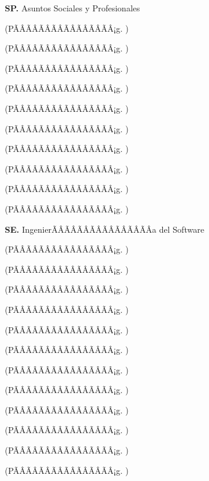 	\textbf{SP.}  Asuntos Sociales y Profesionales%
	\begin{list}{}{%
		\setlength{\labelwidth}{0pt}%
		\setlength{\leftmargin}{15pt}}%
		\item \SPUNODef(PÃÂÃÂÃÂÃÂÃÂÃÂÃÂÃÂ¡g. \pageref{sec:BOK-SP1})
		\item \SPDOSDef(PÃÂÃÂÃÂÃÂÃÂÃÂÃÂÃÂ¡g. \pageref{sec:BOK-SP2})
		\item \SPTRESDef(PÃÂÃÂÃÂÃÂÃÂÃÂÃÂÃÂ¡g. \pageref{sec:BOK-SP3})
		\item \SPCUATRODef(PÃÂÃÂÃÂÃÂÃÂÃÂÃÂÃÂ¡g. \pageref{sec:BOK-SP4})
		\item \SPCINCODef(PÃÂÃÂÃÂÃÂÃÂÃÂÃÂÃÂ¡g. \pageref{sec:BOK-SP5})
		\item \SPSEISDef(PÃÂÃÂÃÂÃÂÃÂÃÂÃÂÃÂ¡g. \pageref{sec:BOK-SP6})
		\item \SPSIETEDef(PÃÂÃÂÃÂÃÂÃÂÃÂÃÂÃÂ¡g. \pageref{sec:BOK-SP7})
		\item \SPOCHODef(PÃÂÃÂÃÂÃÂÃÂÃÂÃÂÃÂ¡g. \pageref{sec:BOK-SP8})
		\item \SPNUEVEDef(PÃÂÃÂÃÂÃÂÃÂÃÂÃÂÃÂ¡g. \pageref{sec:BOK-SP9})
		\item \SPDIEZDef(PÃÂÃÂÃÂÃÂÃÂÃÂÃÂÃÂ¡g. \pageref{sec:BOK-SP10})
	\end{list}%
	\textbf{SE.}  IngenierÃÂÃÂÃÂÃÂÃÂÃÂÃÂÃÂ­a del Software%
	\begin{list}{}{%
		\setlength{\labelwidth}{0pt}%
		\setlength{\leftmargin}{15pt}}%
		\item \SEUNODef(PÃÂÃÂÃÂÃÂÃÂÃÂÃÂÃÂ¡g. \pageref{sec:BOK-SE1})
		\item \SEDOSDef(PÃÂÃÂÃÂÃÂÃÂÃÂÃÂÃÂ¡g. \pageref{sec:BOK-SE2})
		\item \SETRESDef(PÃÂÃÂÃÂÃÂÃÂÃÂÃÂÃÂ¡g. \pageref{sec:BOK-SE3})
		\item \SECUATRODef(PÃÂÃÂÃÂÃÂÃÂÃÂÃÂÃÂ¡g. \pageref{sec:BOK-SE4})
		\item \SECINCODef(PÃÂÃÂÃÂÃÂÃÂÃÂÃÂÃÂ¡g. \pageref{sec:BOK-SE5})
		\item \SESEISDef(PÃÂÃÂÃÂÃÂÃÂÃÂÃÂÃÂ¡g. \pageref{sec:BOK-SE6})
		\item \SESIETEDef(PÃÂÃÂÃÂÃÂÃÂÃÂÃÂÃÂ¡g. \pageref{sec:BOK-SE7})
		\item \SEOCHODef(PÃÂÃÂÃÂÃÂÃÂÃÂÃÂÃÂ¡g. \pageref{sec:BOK-SE8})
		\item \SENUEVEDef(PÃÂÃÂÃÂÃÂÃÂÃÂÃÂÃÂ¡g. \pageref{sec:BOK-SE9})
		\item \SEDIEZDef(PÃÂÃÂÃÂÃÂÃÂÃÂÃÂÃÂ¡g. \pageref{sec:BOK-SE10})
		\item \SEONCEDef(PÃÂÃÂÃÂÃÂÃÂÃÂÃÂÃÂ¡g. \pageref{sec:BOK-SE11})
		\item \SEDOCEDef(PÃÂÃÂÃÂÃÂÃÂÃÂÃÂÃÂ¡g. \pageref{sec:BOK-SE12})
	\end{list}%
